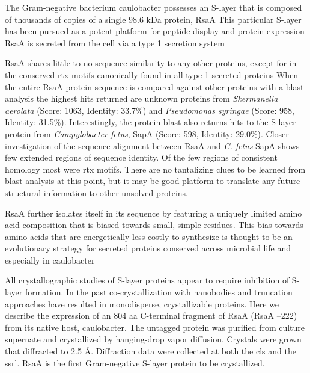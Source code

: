 The Gram-negative bacterium \acl{caulobacter} possesses an
\ac{S-layer} that is composed of thousands of copies of a single 98.6 kDa protein, RsaA
 This particular \ac{S-layer} has been pursued as a potent platform for peptide display and
protein expression
RsaA is secreted from the cell via a type 1
secretion system

 RsaA shares little to no sequence similarity to any
other proteins, except for in the conserved \ac{rtx}
motifs canonically found in all type 1 secreted
proteins When the entire RsaA protein
sequence is compared against other proteins with a \ac{blast} analysis the
highest hits returned are unknown proteins from \textit{Skermanella aerolata}
(Score: 1063, Identity: 33.7\%) and \textit{Pseudomonas syringae} (Score: 958,
Identity: 31.5\%). Interestingly, the protein \ac{blast} also returns hits to
the \ac{S-layer} protein from \textit{Campylobacter fetus}, SapA (Score: 598,
Identity: 29.0\%). Closer investigation of the sequence alignment between RsaA
and \textit{C. fetus} SapA shows few extended regions of sequence identity. 
Of the few regions of consistent homology most were \ac{rtx} motifs. There are
no tantalizing clues to be learned from \ac{blast} analysis at this point, but it
may be good platform to translate any future structural information to other
unsolved proteins.

 RsaA further isolates itself in its sequence by featuring a uniquely limited amino
acid composition that is biased towards small, simple residues. This bias
towards  amino acids that are energetically less costly to synthesize is thought to be an evolutionary strategy
for secreted proteins conserved across microbial life and especially in
\ac{caulobacter}

All crystallographic studies of \ac{S-layer} proteins appear to require inhibition of \ac{S-layer} formation. In the
past co-crystallization with nanobodies
 and truncation
 approaches have resulted in monodisperse, crystallizable proteins. Here we describe the
expression of an 804 \ac{aa} C-terminal fragment of RsaA (RsaA --222) from
its native host, \ac{caulobacter}. The untagged protein was purified
from culture supernate and crystallized by hanging-drop vapor
diffusion. Crystals were grown that diffracted to 2.5 \AA.
Diffraction data were collected at both the \ac{cls} 
and the \ac{ssrl}. RsaA is the first Gram-negative \ac{S-layer} protein to be
crystallized.

